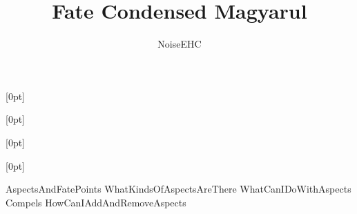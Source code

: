 \documentclass[oneside]{book}
\title{Fate Condensed Magyarul}
\author{NoiseEHC}
\date{}
\begin{document}

\titleformat{\chapter}[hang]{}{}{0pt}{\RobotoCondensed\Huge\MakeUppercase}
\titlespacing{\chapter}{0pt}{0pt}{0pt}[0pt]
\titleformat{\section}[hang]{}{}{0pt}{\RobotoCondensed\huge}
\titlespacing{\section}{0pt}{0pt}{0pt}[0pt]
\titleformat{\subsection}[hang]{}{}{0pt}{\RobotoCondensed\LARGE\MakeUppercase}
\titlespacing{\subsection}{0pt}{0pt}{0pt}[0pt]
\titleformat{\subsubsection}[hang]{}{}{0pt}{\RobotoCondensed\large\MakeUppercase}
\titlespacing{\subsubsection}{0pt}{0pt}{0pt}[0pt]















 {AspectsAndFatePoints}
 {WhatKindsOfAspectsAreThere}
 {WhatCanIDoWithAspects}
 {Compels}
 {HowCanIAddAndRemoveAspects}
\end{document}
